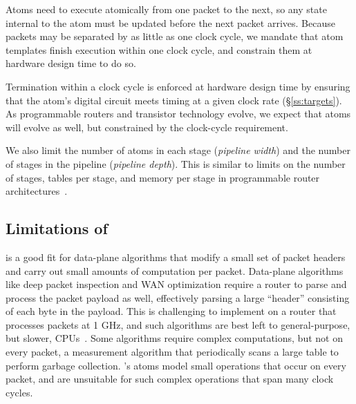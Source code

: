  Atoms need to execute atomically from one
packet to the next, so any state internal to the atom must be updated before
the next packet arrives.  Because packets may be separated by as little as one
clock cycle, we mandate that atom templates finish execution within one clock
cycle, and constrain them at hardware design time to do so.

Termination within a clock cycle is enforced at hardware design time by ensuring that the atom's
digital circuit meets timing at a given clock rate (\S\ref{ss:targets}). As
programmable routers and transistor technology evolve,
we expect that atoms will evolve as well, but constrained by the clock-cycle
requirement.

 We also limit the number of atoms in each stage
(\textit{pipeline width}) and the number of stages in the pipeline
(\textit{pipeline depth}). This is similar to limits on the number of stages,
tables per stage, and memory per stage in programmable router
architectures~\cite{lavanya_compiler, rmt}.

\subsection{Limitations of \absmachine}
\label{domino_ss:limitations}

\absmachine is a good fit for data-plane algorithms that modify a small set of
packet headers and carry out small amounts of computation per packet.
Data-plane algorithms like deep packet inspection and WAN optimization require
a router to parse and process the packet payload as well, effectively parsing a
large ``header'' consisting of each byte in the payload. This is challenging to
implement on a router that processes packets at 1 GHz, and such algorithms are best left to
general-purpose, but slower, CPUs~\cite{e2}.  Some
algorithms require complex computations, but not on every packet, \eg a
measurement algorithm that periodically scans a large table to perform garbage
collection.  \absmachine's atoms model small operations that occur on every
packet, and are unsuitable for such complex operations that span many clock
cycles.

